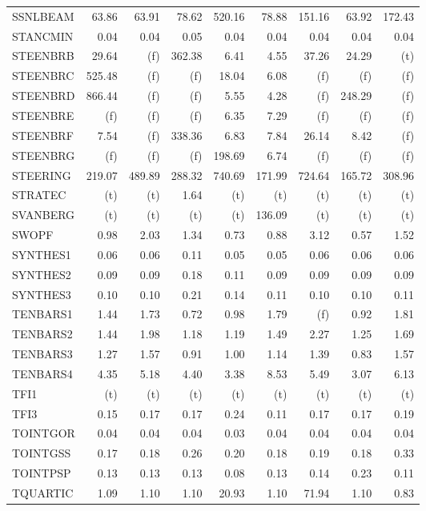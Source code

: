 \documentclass[11pt,twoside]{article}
\begin{document}
{\begin{longtable}[c]{|l|r|r|r|r|r|r|r|r|}
SSNLBEAM & 63.86 & 63.91 & 78.62 & 520.16 & 78.88 & 151.16 & 63.92 & 172.43 \\
STANCMIN & 0.04 & 0.04 & 0.05 & 0.04 & 0.04 & 0.04 & 0.04 & 0.04 \\
STEENBRB & 29.64 & (f) & 362.38 & 6.41 & 4.55 & 37.26 & 24.29 & (t) \\
STEENBRC & 525.48 & (f) & (f) & 18.04 & 6.08 & (f) & (f) & (f) \\
STEENBRD & 866.44 & (f) & (f) & 5.55 & 4.28 & (f) & 248.29 & (f) \\
STEENBRE & (f) & (f) & (f) & 6.35 & 7.29 & (f) & (f) & (f) \\
STEENBRF & 7.54 & (f) & 338.36 & 6.83 & 7.84 & 26.14 & 8.42 & (f) \\
STEENBRG & (f) & (f) & (f) & 198.69 & 6.74 & (f) & (f) & (f) \\
STEERING & 219.07 & 489.89 & 288.32 & 740.69 & 171.99 & 724.64 & 165.72 & 308.96 \\
STRATEC & (t) & (t) & 1.64 & (t) & (t) & (t) & (t) & (t) \\
SVANBERG & (t) & (t) & (t) & (t) & 136.09 & (t) & (t) & (t) \\
SWOPF & 0.98 & 2.03 & 1.34 & 0.73 & 0.88 & 3.12 & 0.57 & 1.52 \\
SYNTHES1 & 0.06 & 0.06 & 0.11 & 0.05 & 0.05 & 0.06 & 0.06 & 0.06 \\
SYNTHES2 & 0.09 & 0.09 & 0.18 & 0.11 & 0.09 & 0.09 & 0.09 & 0.09 \\
SYNTHES3 & 0.10 & 0.10 & 0.21 & 0.14 & 0.11 & 0.10 & 0.10 & 0.11 \\
TENBARS1 & 1.44 & 1.73 & 0.72 & 0.98 & 1.79 & (f) & 0.92 & 1.81 \\
TENBARS2 & 1.44 & 1.98 & 1.18 & 1.19 & 1.49 & 2.27 & 1.25 & 1.69 \\
TENBARS3 & 1.27 & 1.57 & 0.91 & 1.00 & 1.14 & 1.39 & 0.83 & 1.57 \\
TENBARS4 & 4.35 & 5.18 & 4.40 & 3.38 & 8.53 & 5.49 & 3.07 & 6.13 \\
TFI1 & (t) & (t) & (t) & (t) & (t) & (t) & (t) & (t) \\
TFI3 & 0.15 & 0.17 & 0.17 & 0.24 & 0.11 & 0.17 & 0.17 & 0.19 \\
TOINTGOR & 0.04 & 0.04 & 0.04 & 0.03 & 0.04 & 0.04 & 0.04 & 0.04 \\
TOINTGSS & 0.17 & 0.18 & 0.26 & 0.20 & 0.18 & 0.19 & 0.18 & 0.33 \\
TOINTPSP & 0.13 & 0.13 & 0.13 & 0.08 & 0.13 & 0.14 & 0.23 & 0.11 \\
TQUARTIC & 1.09 & 1.10 & 1.10 & 20.93 & 1.10 & 71.94 & 1.10 & 0.83 \\

\end{longtable}}
\end{document}
